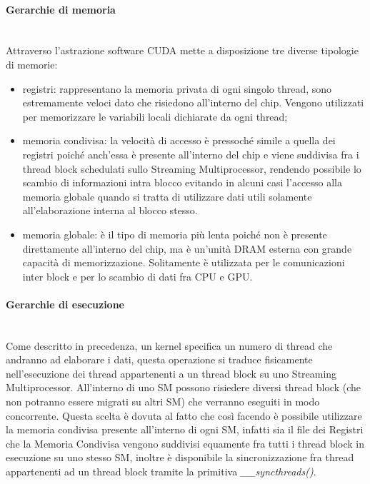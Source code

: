 \paragraph{Gerarchie di memoria}\mbox{}
\\
Attraverso l'astrazione software CUDA mette a disposizione tre diverse
tipologie di memorie\cite{kirk2007nvidia}:

\begin{itemize}
    \item registri: rappresentano la memoria privata di ogni singolo thread,
        sono estremamente veloci dato che risiedono all'interno del chip.
        Vengono utilizzati per memorizzare le
        variabili locali dichiarate da ogni thread;
    
    \item memoria condivisa: la velocità di accesso è pressoché simile a quella
        dei registri poiché anch'essa è presente all'interno del chip e viene
        suddivisa fra i thread block schedulati sullo Streaming Multiprocessor,
        rendendo possibile lo scambio di informazioni intra blocco evitando
        in alcuni casi l'accesso alla memoria globale quando si tratta di
        utilizzare dati utili solamente all'elaborazione interna al
        blocco stesso.

    \item memoria globale: è il tipo di memoria più lenta poiché non è presente
        direttamente all'interno del chip, ma è un'unità DRAM esterna con grande
        capacità di memorizzazione. Solitamente è utilizzata per le
        comunicazioni inter block e per lo scambio di dati fra CPU e GPU.
\end{itemize}

\paragraph{Gerarchie di esecuzione}\mbox{}
\\
Come descritto in precedenza, un kernel specifica un numero di thread che
andranno ad elaborare i dati, questa operazione si traduce fisicamente
nell'esecuzione dei thread appartenenti a un thread block su uno
Streaming Multiprocessor. All'interno di uno SM possono risiedere
diversi thread block (che non potranno essere migrati su altri SM)
che verranno eseguiti in modo concorrente. Questa scelta è dovuta al fatto
che così facendo è possibile utilizzare la memoria condivisa presente
all'interno di ogni SM, infatti sia il file dei Registri che la Memoria
Condivisa vengono suddivisi equamente fra tutti i thread block in esecuzione
su uno stesso SM, inoltre è disponibile la sincronizzazione fra thread
appartenenti ad un thread block tramite la primitiva \textit{\_\_syncthreads()}.

